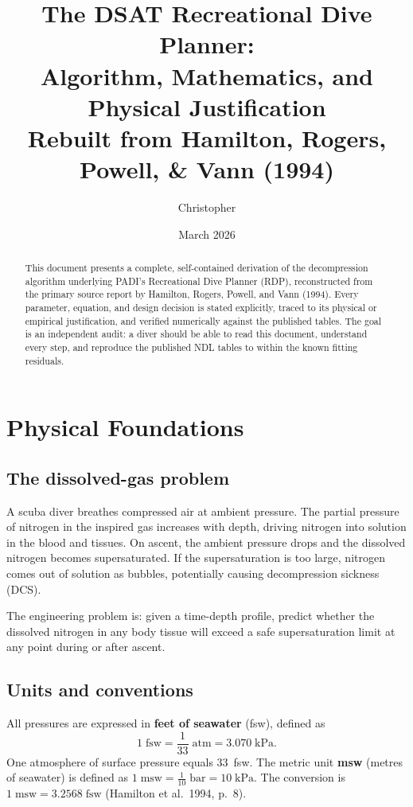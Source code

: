 \documentclass[11pt,letterpaper]{article}
\title{The DSAT Recreational Dive Planner:\\
       Algorithm, Mathematics, and Physical Justification\\[6pt]
       \large Rebuilt from Hamilton, Rogers, Powell, \& Vann (1994)}
\author{Christopher}
\date{March 2026}
\begin{document}
\maketitle

\begin{abstract}
This document presents a complete, self-contained derivation of the decompression
algorithm underlying PADI's Recreational Dive Planner (RDP), reconstructed from
the primary source report by Hamilton, Rogers, Powell, and Vann (1994).
Every parameter, equation, and design decision is stated explicitly, traced to
its physical or empirical justification, and verified numerically against the
published tables.  The goal is an independent audit: a diver should be able
to read this document, understand every step, and reproduce the published
NDL tables to within the known fitting residuals.
\end{abstract}

\tableofcontents
\newpage

\section{Physical Foundations}

\subsection{The dissolved-gas problem}

A scuba diver breathes compressed air at ambient pressure.  The partial
pressure of nitrogen in the inspired gas increases with depth, driving
nitrogen into solution in the blood and tissues.  On ascent, the ambient
pressure drops and the dissolved nitrogen becomes supersaturated.  If
the supersaturation is too large, nitrogen comes out of solution as
bubbles, potentially causing decompression sickness (DCS).

The engineering problem is: given a time-depth profile, predict whether
the dissolved nitrogen in any body tissue will exceed a safe
supersaturation limit at any point during or after ascent.

\subsection{Units and conventions}

All pressures are expressed in \textbf{feet of seawater} (fsw), defined as
\[
  1\;\text{fsw} = \frac{1}{33}\;\text{atm} = 3.070\;\text{kPa}.
\]
One atmosphere of surface pressure equals $33$~fsw.  The metric unit
\textbf{msw} (metres of seawater) is defined as $1\;\text{msw} = \tfrac{1}{10}\;\text{bar} = 10\;\text{kPa}$.
The conversion is
$1\;\text{msw} = 3.2568\;\text{fsw}$
(Hamilton et al.\ 1994, p.~8).
\end{document}
